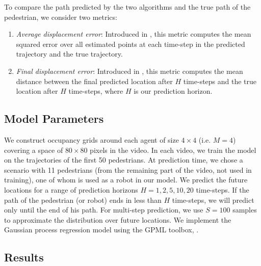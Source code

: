 To compare the path predicted by the two algorithms and the true path
of the pedestrian, we consider two metrics:
\begin{enumerate}
\item \textit{Average displacement error}: Introduced in
  \cite{pellegrini09}, this metric computes the mean squared error
  over all estimated points at each time-step in the predicted
  trajectory and the true trajectory.
\item \textit{Final displacement error}: Introduced in \cite{alahi16},
  this metric computes the mean distance between the final predicted
  location after $H$ time-steps and the true location after $H$
  time-steps, where $H$ is our prediction horizon.
\end{enumerate}

\subsection{Model Parameters}
\label{sec:model-parameters}

We construct occupancy grids around each agent of size $4 \times 4$ (i.e. $M=4$) covering a space of $80 \times 80$ pixels in the video. In each video, we train the model on the trajectories of the first 50 pedestrians. At prediction time, we chose a scenario with 11 pedestrians (from the remaining part of the video, not used in training), one of whom is used as a robot in our model. We predict the future locations for a range of prediction horizons $H = 1,2,5,10,20$ time-steps. If the path of the pedestrian (or robot) ends in less than $H$ time-steps, we will predict only until the end of his path. For multi-step prediction, we use $S = 100$ samples to approximate the distribution over future locations. We implement the Gaussian process regression model using the GPML toolbox, \cite{rasmussen06}.


\subsection{Results}
\label{sec:results}

